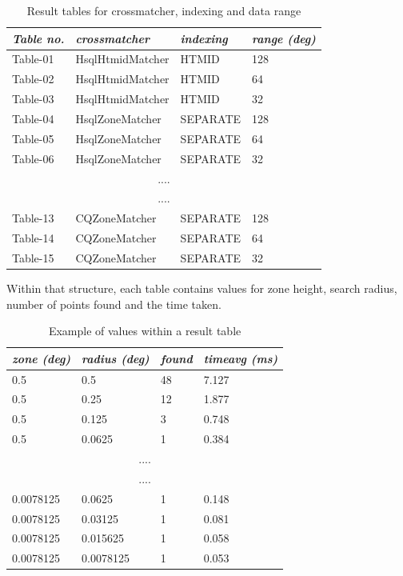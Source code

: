 \documentclass{article}
\newcommand{\crossmatcher} {crossmatcher\xspace}
\begin{document}
\begin{table}[hbt!]
\centering
\begin{tabular}{|l|l|l|l|}
\hline
\textit{Table no.} & \textit{\crossmatcher} & \textit{indexing} & \textit{range (deg)} \\ \hline
Table-01 & HsqlHtmidMatcher & HTMID & 128 \\ \hline
Table-02 & HsqlHtmidMatcher & HTMID & 64 \\ \hline
Table-03 & HsqlHtmidMatcher & HTMID & 32 \\ \hline
Table-04 & HsqlZoneMatcher & SEPARATE & 128 \\ \hline
Table-05 & HsqlZoneMatcher & SEPARATE & 64 \\ \hline
Table-06 & HsqlZoneMatcher & SEPARATE & 32 \\ \hline
\multicolumn{4}{|c|}{....} \\ \hline
\multicolumn{4}{|c|}{....} \\ \hline
Table-13 & CQZoneMatcher & SEPARATE & 128 \\ \hline
Table-14 & CQZoneMatcher & SEPARATE & 64 \\ \hline
Table-15 & CQZoneMatcher & SEPARATE & 32 \\ \hline
\end{tabular}
\caption{Result tables for \crossmatcher, indexing and data range}
\label{tab:result-table-mapping}
\end{table}

Within that structure, each table contains values for zone height, search radius, number of points found and the time taken.

\begin{table}[hbt!]
\centering
\begin{tabular}{|l|l|l|l|}
\hline
\textit{zone (deg)} & \textit{radius (deg)} & \textit{found} & \textit{timeavg (ms)} \\ \hline
0.5 & 0.5    & 48 & 7.127 \\ \hline
0.5 & 0.25   & 12 & 1.877 \\ \hline
0.5 & 0.125  &  3 & 0.748 \\ \hline
0.5 & 0.0625 &  1 & 0.384 \\ \hline
\multicolumn{4}{|c|}{....} \\ \hline
\multicolumn{4}{|c|}{....} \\ \hline
0.0078125 & 0.0625    & 1 & 0.148 \\ \hline
0.0078125 & 0.03125   & 1 & 0.081 \\ \hline
0.0078125 & 0.015625  & 1 & 0.058 \\ \hline
0.0078125 & 0.0078125 & 1 & 0.053 \\ \hline
\end{tabular}
\caption{Example of values within a result table}
\label{tab:result-table-example}
\end{table}
\end{document}
